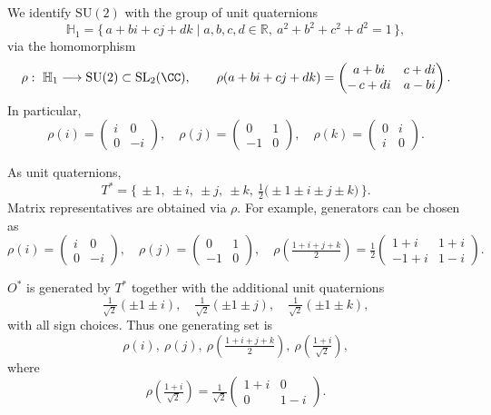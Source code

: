 \documentclass[leqno]{ltjsarticle}
\begin{document}
We identify $\mathrm{SU}(2)$ with the group of unit quaternions
\[
\mathbb{H}_1=\{\,a+bi+cj+dk \mid a,b,c,d\in\mathbb{R},\ a^2+b^2+c^2+d^2=1\,\},
\]
via the homomorphism
\[
\rho:\ \mathbb{H}_1 \longrightarrow \mathrm{SU}(2)\subset \mathrm{SL}_2(\CC),\qquad
\rho(a+bi+cj+dk)=
\begin{pmatrix}
a+bi & c+di\\
-\,c+di & a-bi
\end{pmatrix}.
\]
In particular,
\[
\rho(i)=\begin{pmatrix} i&0\\0&-i\end{pmatrix},\quad
\rho(j)=\begin{pmatrix}0&1\\-1&0\end{pmatrix},\quad
\rho(k)=\begin{pmatrix}0&i\\ i&0\end{pmatrix}.
\]

\medskip

As unit quaternions,
\[
T^* = \Big\{\,\pm1,\ \pm i,\ \pm j,\ \pm k,\ \tfrac{1}{2}\big(\pm1\pm i\pm j\pm k\big)\,\Big\}.
\]
Matrix representatives are obtained via $\rho$.  
For example, generators can be chosen as
\[
\rho(i)=\begin{pmatrix} i&0\\[2pt]0&-i\end{pmatrix},\quad
\rho(j)=\begin{pmatrix}0&1\\[2pt]-1&0\end{pmatrix},\quad
\rho\!\left(\tfrac{1+i+j+k}{2}\right)=\tfrac{1}{2}
\begin{pmatrix}
1+i & 1+i\\[2pt]
-1+i & 1-i
\end{pmatrix}.
\]

\medskip

$O^*$ is generated by $T^*$ together with the additional unit quaternions
\[
\tfrac{1}{\sqrt{2}}(\pm1 \pm i),\quad
\tfrac{1}{\sqrt{2}}(\pm1 \pm j),\quad
\tfrac{1}{\sqrt{2}}(\pm1 \pm k),
\]
with all sign choices.  
Thus one generating set is
\[
\rho(i),\ \rho(j),\ \rho\!\left(\tfrac{1+i+j+k}{2}\right),\
\rho\!\left(\tfrac{1+i}{\sqrt{2}}\right),
\]
where
\[
\rho\!\left(\tfrac{1+i}{\sqrt{2}}\right)
=\tfrac{1}{\sqrt{2}}\begin{pmatrix}1+i&0\\[2pt]0&1-i\end{pmatrix}.
\]
\end{document}
